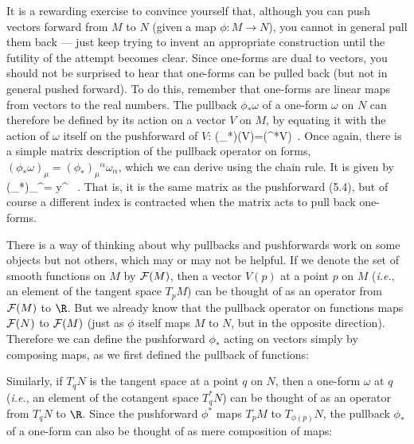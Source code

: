 It is a rewarding exercise to convince yourself that, although you can
push vectors forward from $M$ to $N$ (given a map $\phi:
M\rightarrow N$), you cannot in general pull them back --- just keep trying 
to invent an appropriate construction until the futility of the attempt
becomes clear.  Since one-forms are dual to vectors, you should 
not be surprised to hear that one-forms can be pulled back (but not
in general pushed forward).  To do this, remember that one-forms are linear 
maps from vectors to the real numbers.  The pullback $\phi_*\omega$ of a
one-form $\omega$ on $N$ can therefore be defined by its action on
a vector $V$ on $M$, by equating it with the action of $\omega$
itself on the pushforward of $V$:
\be
  (\phi_*\omega)(V)=\omega(\phi^*V)\ .\label{5.5}
\ee
Once again, there is a simple matrix description of the pullback 
operator on forms, $(\phi_*\omega)_\mu =(\phi_*)_\mu{}^\alpha 
\omega_\alpha$, which we can derive using the chain rule.  It is
given by
\be
  (\phi_*)_\mu{}^\alpha = {{\partial y^\alpha}}
  \ .\label{5.6}
\ee
That is, it is the same matrix as the pushforward (5.4), but of course a 
different index is contracted when the matrix acts to pull back
one-forms.

There is a way of thinking about why pullbacks and pushforwards work
on some objects but not others, which may or may not be helpful.
If we denote the set of smooth functions on $M$ by ${\cal F}(M)$,
then a vector $V(p)$ at a point $p$ on $M$ ({\it i.e.}, an element of 
the tangent space $T_pM$) can be thought of as an operator from 
${\cal F}(M)$ to $\R$.  But we already know that the pullback operator
on functions maps ${\cal F}(N)$ to ${\cal F}(M)$ (just as $\phi$
itself maps $M$ to $N$, but in the opposite direction).  Therefore
we can define the pushforward $\phi_*$ acting on vectors simply by
composing maps, as we first defined the pullback of functions:

\begin{figure}[h]
  \centerline{
  }
\end{figure}

\noindent Similarly, if $T_qN$ is the tangent space at a point $q$ on $N$,
then a one-form $\omega$ at $q$ 
({\it i.e.}, an element of the cotangent space $T_q^*N$) can be thought of 
as an operator from $T_qN$ to $\R$.  Since the pushforward
$\phi^*$ maps $T_pM$ to $T_{\phi(p)}N$, the pullback $\phi_*$
of a one-form can also be thought of as mere composition of maps:

